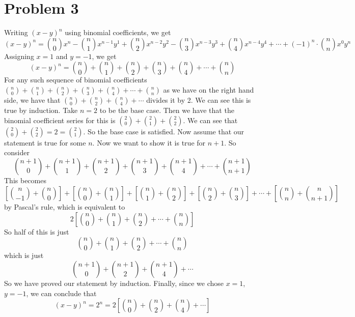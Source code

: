 \documentclass{article}
\begin{document}
\section*{Problem 3}
Writing $(x-y)^n$ using binomial coefficients, we get
\[ (x-y)^n = \binom{n}{0}x^n - \binom{n}{1}x^{n-1}y^1 + \binom{n}{2}x^{n-2}y^2
- \binom{n}{3}x^{n-3}y^3 + \binom{n}{4}x^{n-4}y^4 + \cdots + (-1)^n \cdot
\binom{n}{n}x^0y^n \]
Assigning $x=1$ and $y=-1$, we get
\[ (x-y)^n = \binom{n}{0} + \binom{n}{1} + \binom{n}{2} + \binom{n}{3}
    + \binom{n}{4} + \cdots + \binom{n}{n} \]
For any such sequence of binomial coefficients $\binom{n}{0} + \binom{n}{1} +
\binom{n}{2} + \binom{n}{3} + \binom{n}{4} + \cdots + \binom{n}{n}$ as we have
on the right hand side, we have that $\binom{n}{0} + \binom{n}{2} + \binom{n}{4}
+ \cdots$ divides it by 2. We can see this is true by induction. Take $n=2$
to be the base case. Then we have that the binomial coefficient series for this
is $\binom{2}{0} + \binom{2}{1} + \binom{2}{2}$. We can see that $\binom{2}{0}
+ \binom{2}{2} = 2 = \binom{2}{1}$. So the base case is satisfied. Now assume
that our statement is true for some $n$. Now we want to show it is true for
$n+1$. So consider
\[ \binom{n+1}{0} + \binom{n+1}{1} + \binom{n+1}{2} + \binom{n+1}{3}
    + \binom{n+1}{4} + \cdots + \binom{n+1}{n+1} \]
This becomes
\[ \left[\binom{n}{-1} + \binom{n}{0}\right] + \left[\binom{n}{0} +
    \binom{n}{1}\right] + \left[\binom{n}{1} + \binom{n}{2}\right] +
    \left[\binom{n}{2} + \binom{n}{3}\right] + \cdots + \left[\binom{n}{n}
    + \binom{n}{n+1}\right] \]
by Pascal's rule, which is equivalent to
\[ 2 \left[\binom{n}{0} + \binom{n}{1} + \binom{n}{2} + \cdots + \binom{n}{n}\right]
\]
So half of this is just
\[ \binom{n}{0} + \binom{n}{1} + \binom{n}{2} + \cdots + \binom{n}{n} \]
which is just
\[ \binom{n+1}{0}  + \binom{n+1}{2} + \binom{n+1}{4} + \cdots \]
So we have proved our statement by induction.
Finally, since we chose $x=1$, $y=-1$, we can conclude that
\[ (x-y)^n = 2^n = 2\left[\binom{n}{0} + \binom{n}{2} + \binom{n}{4} +
    \cdots\right] \]


\end{document}
